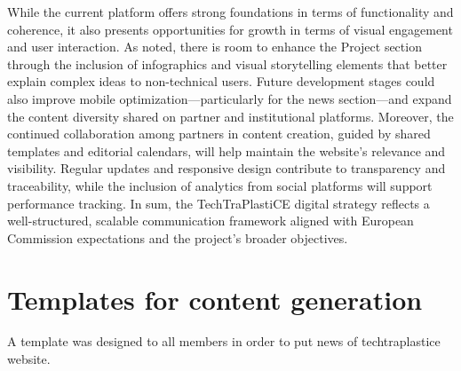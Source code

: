 \documentclass[
  12pt,
  oneside]{book}
\begin{document}
While the current platform offers strong foundations in terms of
functionality and coherence, it also presents opportunities for growth
in terms of visual engagement and user interaction. As noted, there is
room to enhance the Project section through the inclusion of
infographics and visual storytelling elements that better explain
complex ideas to non-technical users. Future development stages could
also improve mobile optimization---particularly for the news
section---and expand the content diversity shared on partner and
institutional platforms. Moreover, the continued collaboration among
partners in content creation, guided by shared templates and editorial
calendars, will help maintain the website's relevance and visibility.
Regular updates and responsive design contribute to transparency and
traceability, while the inclusion of analytics from social platforms
will support performance tracking. In sum, the TechTraPlastiCE digital
strategy reflects a well-structured, scalable communication framework
aligned with European Commission expectations and the project's broader
objectives.

\appendix

\chapter{Templates for content generation}\label{sec-template}

A template was designed to all members in order to put news of
techtraplastice website.




\backmatter
\end{document}
